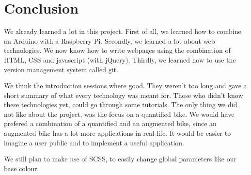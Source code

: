 \section{Conclusion}
We already learned a lot in this project. First of all, we learned how to combine an
Arduino with a Raspberry Pi. Secondly, we learned a lot about web technologies. We now
know how to write webpages using the combination of HTML, CSS and javascript (with
jQuery). Thirdly, we learned how to use the version management system called git.

We think the introduction sessions where good. They weren't too long and gave
a short summary of what every technology was meant for. Those who didn't know these
technologies yet, could go through some tutorials. The only thing we did not like about the project, was the focus on 
a quantified bike. We would have prefered a combination of a quantified and an augmented bike, since an augmented bike
has a lot more applications in real-life. It would be easier to imagine a user public and to implement a useful application.

We still plan to make use of SCSS, to easily change global parameters like our base colour.
